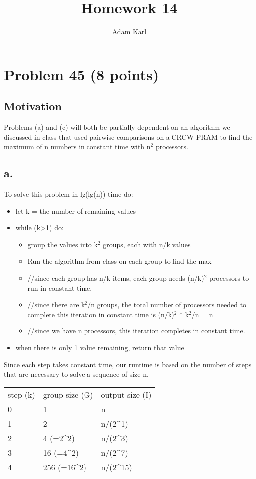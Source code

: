 \documentclass[a4paper]{article}
\title{Homework 14}
\author{Adam Karl}
\begin{document}
\maketitle

\section{Problem 45 (8 points)}
\subsection{Motivation}
Problems (a) and (c) will both be partially dependent on an algorithm we discussed in class that used pairwise comparisons on a CRCW PRAM to find the maximum of n numbers in constant time with n$^2$ processors.

\subsection{a.}
To solve this problem in lg(lg(n)) time do:

\begin{itemize}
    \item let k = the number of remaining values
    \item while (k>1) do:
    \begin{itemize}
        \item group the values into k$^2$ groups, each with n/k values
        \item Run the algorithm from class on each group to find the max
        \item //since each group has n/k items, each group needs (n/k)$^2$ processors to run in constant time.
        \item //since there are k$^2$/n groups, the total number of processors needed to complete this iteration in constant time is (n/k)$^2$ * k$^2$/n = n
        \item //since we have n processors, this iteration completes in constant time.
    \end{itemize}
    \item when there is only 1 value remaining, return that value
\end{itemize}

Since each step takes constant time, our runtime is based on the number of steps that are necessary to solve a sequence of size n.

\begin{table}[htb]
\centering
\begin{tabular}{lll}
step (k) & group size (G)               & output size (I)           \\
0    & 1                            & n                         \\
1    & 2                            & n/(2\textasciicircum{}1)  \\
2    & 4 (=2\textasciicircum{}2)    & n/(2\textasciicircum{}3)  \\
3    & 16 (=4\textasciicircum{}2)   & n/(2\textasciicircum{}7)  \\
4    & 256 (=16\textasciicircum{}2) & n/(2\textasciicircum{}15)
\end{tabular}
\end{table}
\end{document}
